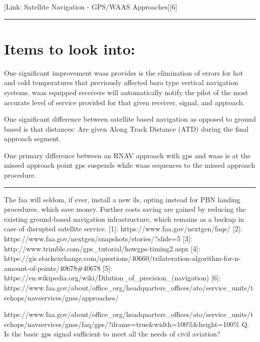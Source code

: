 {[}Link: Satellite Navigation - GPS/WAAS Approaches{]}{[}6{]}

\begin{center}\rule{0.5\linewidth}{\linethickness}\end{center}

\section{Items to look into:}\label{items-to-look-into}

One significant improvement \ac{waas} provides is the elimination of
errors for hot and cold temperatures that previously affected baro type
vertical navigation systems. \ac{waas} equipped receivers will automatically
notify the pilot of the most accurate level of service provided for that
given receiver, signal, and approach.

One significant difference between satellite based navigation as opposed
to ground based is that distances: Are given Along Track Distance (ATD)
during the final approach segment.

One primary difference between an RNAV approach with \ac{gps} and \ac{waas} is at
the missed approach point \ac{gps} suspends while \ac{waas} sequences to the
missed approach procedure.

\begin{center}\rule{0.5\linewidth}{\linethickness}\end{center}

The \ac{faa} will seldom, if ever, install a new \ac{ils}, opting instead for PBN
landing procedures, which save money. Further costs saving are gained by
reducing the existing ground-based navigation infrastructure, which
remains as a backup in case of disrupted satellite service. {[}1{]}:
https://www.faa.gov/nextgen/faqs/ {[}2{]}:
https://www.faa.gov/nextgen/snapshots/stories/?slide=5 {[}3{]}:
http://www.trimble.com/gps\_tutorial/howgps-timing2.aspx {[}4{]}:
https://gis.stackexchange.com/questions/40660/trilateration-algorithm-for-n-amount-of-points/40678\#40678
{[}5{]}:
https://en.wikipedia.org/wiki/Dilution\_of\_precision\_(navigation)
{[}6{]}:
https://www.faa.gov/about/office\_org/headquarters\_offices/ato/service\_units/techops/navservices/gnss/approaches/

https://www.faa.gov/about/office\_org/headquarters\_offices/ato/service\_units/techops/navservices/gnss/faq/gps/?iframe=true\&width=100\%\&height=100\%
Q. Is the basic \ac{gps} signal sufficient to meet all the needs of civil aviation?

